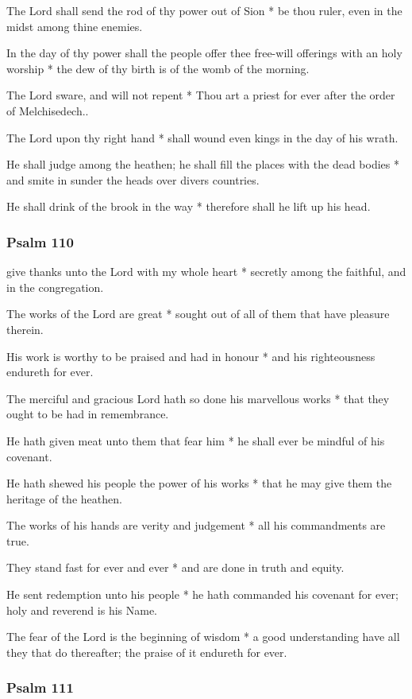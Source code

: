 The Lord shall send the rod of thy power out of Sion * be thou ruler, even in the midst among thine enemies.

In the day of thy power shall the people offer thee free-will offerings with an holy worship * the dew of thy birth is of the womb of the morning.

The Lord sware, and will not repent * Thou art a priest for ever after the order of Melchisedech..

The Lord upon thy right hand * shall wound even kings in the day of his wrath.

He shall judge among the heathen; he shall fill the places with the dead bodies * and smite in sunder the heads over divers countries.

He shall drink of the brook in the way * therefore shall he lift up his head.

\subsubsection{Psalm 110}


 give thanks unto the Lord with my whole heart * secretly among the faithful, and in the congregation.

The works of the Lord are great * sought out of all of them that have pleasure therein.

His work is worthy to be praised and had in honour * and his righteousness endureth for ever.

The merciful and gracious Lord hath so done his marvellous works * that they ought to be had in remembrance.

He hath given meat unto them that fear him * he shall ever be mindful of his covenant.

He hath shewed his people the power of his works * that he may give them the heritage of the heathen.

The works of his hands are verity and judgement * all his commandments are true.

They stand fast for ever and ever * and are done in truth and equity.

He sent redemption unto his people * he hath commanded his covenant for ever; holy and reverend is his Name.

The fear of the Lord is the beginning of wisdom * a good understanding have all they that do thereafter; the praise of it endureth for ever.

\subsubsection{Psalm 111}

